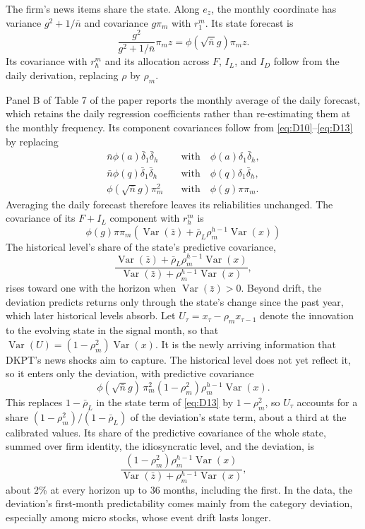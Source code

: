 \documentclass[11pt,letterpaper]{article}
\theoremstyle{remark}
\DeclareMathOperator{\Var}{Var}
\begin{document}
The firm's news items share the state. Along $e_z$, the monthly coordinate has variance $g^2+1/\bar n$ and covariance $g\pi_m$ with $r^m_1$. Its state forecast is
\[
\frac{g^2}{g^2+1/\bar n}\pi_m z
=\phi(\sqrt{\bar n}g)\pi_m z.
\]
Its covariance with $r^m_h$ and its allocation across $F$, $I_L$, and $I_D$ follow from the daily derivation, replacing $\rho$ by $\rho_m$.

Panel B of Table 7 of the paper reports the monthly average of the daily forecast, which retains the daily regression coefficients rather than re-estimating them at the monthly frequency. Its component covariances follow from \eqref{eq:D10}--\eqref{eq:D13} by replacing
\[
\begin{aligned}
\bar n\phi(a)\bar\delta_1\bar\delta_h
&\quad\text{with}\quad \phi(a)\delta_1\bar\delta_h,\\
\bar n\phi(q)\bar\delta_1\bar\delta_h
&\quad\text{with}\quad \phi(q)\delta_1\bar\delta_h,\\
\phi(\sqrt{\bar n}g)\pi_m^2
&\quad\text{with}\quad \phi(g)\pi\pi_m.
\end{aligned}
\]
Averaging the daily forecast therefore leaves its reliabilities unchanged. The covariance of its $F+I_L$ component with $r_h^m$ is
\begin{equation}\label{eq:D14}
\phi(g)\pi\pi_m
\left(\Var(\bar z)+\bar\rho_L\rho_m^{h-1}\Var(x)\right)
\end{equation}
The historical level's share of the state's predictive covariance,
\[
\frac{\Var(\bar z)+\bar\rho_L\rho_m^{h-1}\Var(x)}
{\Var(\bar z)+\rho_m^{h-1}\Var(x)},
\]
rises toward one with the horizon when $\Var(\bar z)>0$. Beyond drift, the deviation predicts returns only through the state's change since the past year, which later historical levels absorb. Let $U_\tau=x_\tau-\rho_m x_{\tau-1}$ denote the innovation to the evolving state in the signal month, so that $\Var(U)=(1-\rho_m^2)\Var(x)$. It is the newly arriving information that DKPT's news shocks aim to capture. The historical level does not yet reflect it, so it enters only the deviation, with predictive covariance
\[
\phi(\sqrt{\bar n}g)\,\pi_m^2(1-\rho_m^2)\rho_m^{h-1}\Var(x).
\]
This replaces $1-\bar\rho_L$ in the state term of \eqref{eq:D13} by $1-\rho_m^2$, so $U_\tau$ accounts for a share $(1-\rho_m^2)/(1-\bar\rho_L)$ of the deviation's state term, about a third at the calibrated values. Its share of the predictive covariance of the whole state, summed over firm identity, the idiosyncratic level, and the deviation, is
\[
\frac{(1-\rho_m^2)\rho_m^{h-1}\Var(x)}{\Var(\bar z)+\rho_m^{h-1}\Var(x)},
\]
about 2\% at every horizon up to 36 months, including the first. In the data, the deviation's first-month predictability comes mainly from the category deviation, especially among micro stocks, whose event drift lasts longer.
\end{document}
